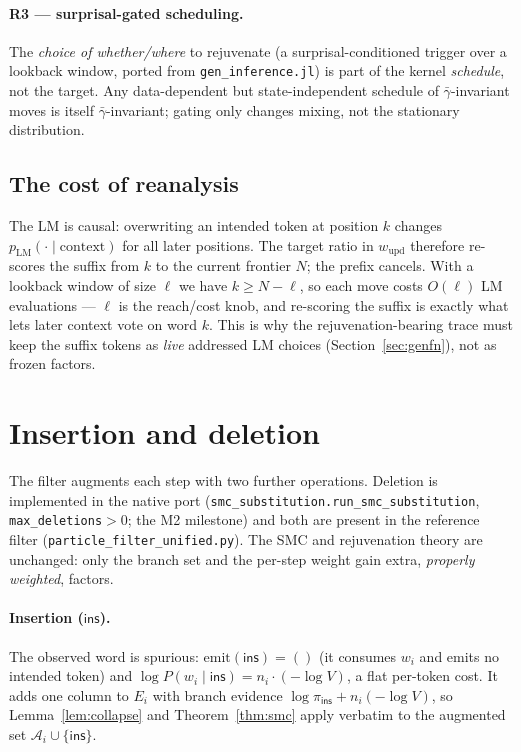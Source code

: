 \documentclass[11pt]{article}
\newcommand{\inssact}{\textsf{ins}}
\newcommand{\given}{\mid}
\newcommand{\pLM}{p_{\mathrm{LM}}}
\newcommand{\code}[1]{\texttt{#1}}
\begin{document}
\paragraph{R3 — surprisal-gated scheduling.} The \emph{choice of whether/where} to rejuvenate (a
surprisal-conditioned trigger over a lookback window, ported from \code{gen\_inference.jl}) is part of
the kernel \emph{schedule}, not the target. Any data-dependent but state-independent schedule of
$\bar\gamma$-invariant moves is itself $\bar\gamma$-invariant; gating only changes mixing, not the
stationary distribution.

\subsection{The cost of reanalysis}

The LM is causal: overwriting an intended token at position $k$ changes
$\pLM(\cdot\given\text{context})$ for all later positions. The target ratio in $w_{\mathrm{upd}}$
therefore re-scores the suffix from $k$ to the current frontier $N$; the prefix cancels. With a
lookback window of size $\ell$ we have $k \ge N-\ell$, so each move costs $O(\ell)$ LM evaluations —
$\ell$ is the reach/cost knob, and re-scoring the suffix is exactly what lets later context vote on
word $k$. This is why the rejuvenation-bearing trace must keep the suffix tokens as \emph{live}
addressed LM choices (Section~\ref{sec:genfn}), not as frozen factors.

\section{Insertion and deletion}
\label{sec:extensions}

The filter augments each step with two further operations. Deletion is implemented in the native
port (\code{smc\_substitution.run\_smc\_substitution}, \code{max\_deletions}${>}0$; the M2
milestone) and both are present in the reference filter (\code{particle\_filter\_unified.py}). The
SMC and rejuvenation theory are unchanged: only the branch set and the per-step weight gain extra,
\emph{properly weighted}, factors.

\paragraph{Insertion ($\inssact$).} The observed word is spurious: $\mathrm{emit}(\inssact)=()$
(it consumes $w_i$ and emits no intended token) and $\log P(w_i\given\inssact) = n_i\cdot(-\log V)$,
a flat per-token cost. It adds one column to $E_i$ with branch evidence
$\log\pi_{\inssact} + n_i(-\log V)$, so Lemma~\ref{lem:collapse} and Theorem~\ref{thm:smc} apply
verbatim to the augmented set $\mathcal A_i\cup\{\inssact\}$.
\end{document}
